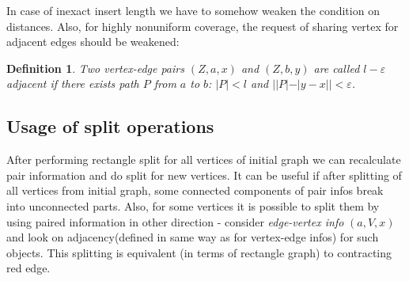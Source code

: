 \documentclass[12pt,a4paper,oneside]{article}
\newtheorem{definition}{Definition}
\def\eps{\varepsilon}
\begin{document}
In case of inexact insert length we have to somehow weaken the condition on distances.
Also, for highly nonuniform coverage, the request of sharing vertex for adjacent edges should be weakened:

\begin{definition}
 Two vertex-edge pairs $(Z,a,x)$ and $(Z,b,y)$ are called \emph{$l-\eps$ adjacent} if there exists path $P$ from $a$ to $b$: $|P|<l$ and $||P| - |y-x|| < \eps$.   
\end{definition}

\subsection{Usage of split operations}

After performing rectangle split for all vertices of initial graph we can recalculate pair information and do split for new vertices. It can be useful if after splitting of all vertices from initial graph, some connected components of pair infos break into unconnected parts. 
Also, for some vertices it is possible to split them by using paired information in other direction - consider \emph{edge-vertex info} $(a, V, x)$ and look on adjacency(defined in same way as for vertex-edge infos) for such objects. This splitting is equivalent (in terms of rectangle graph) to contracting red edge. 


\end{document}
